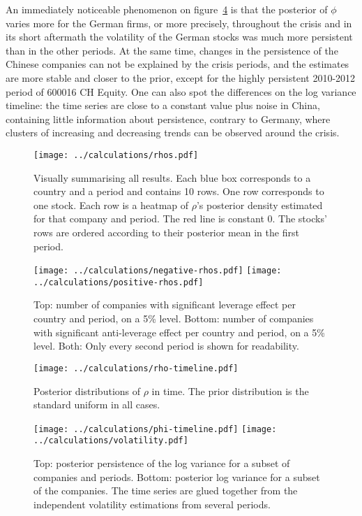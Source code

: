 An immediately noticeable phenomenon on figure~\ref{fig:persistence} is that the posterior of $\phi$ varies more for the German firms, or more precisely, throughout the crisis and in its short aftermath the volatility of the German stocks was much more persistent than in the other periods.
At the same time, changes in the persistence of the Chinese companies can not be explained by the crisis periods, and the estimates are more stable and closer to the prior, except for the highly persistent 2010-2012 period of 600016 CH Equity.
One can also spot the differences on the log variance timeline: the time series are close to a constant value plus noise in China, containing little information about persistence, contrary to Germany, where clusters of increasing and decreasing trends can be observed around the crisis.

\begin{figure}[p]
	\vspace*{-3.2cm}
	\centering
	\texttt{[image: ../calculations/rhos.pdf]}
	\caption[Visually summarising all results]{Visually summarising all results. Each blue box corresponds to a country and a period and contains 10 rows. One row corresponds to one stock. Each row is a heatmap of $\rho$'s posterior density estimated for that company and period. The red line is constant 0. The stocks' rows are ordered according to their posterior mean in the first period.}
	\label{fig:rhos}
\end{figure}


\begin{figure}[p]
	\vspace*{-3.2cm}
	\centering
	\texttt{[image: ../calculations/negative-rhos.pdf]}
	\texttt{[image: ../calculations/positive-rhos.pdf]}
	\caption[Significant leverage effect]{Top: number of companies with significant leverage effect per country and period, on a 5\% level. Bottom: number of companies with significant anti-leverage effect per country and period, on a 5\% level. Both: Only every second period is shown for readability.}
	\label{fig:negative-rhos}
\end{figure}


\begin{figure}[p]
	\vspace*{-3.2cm}
	\centering
	\texttt{[image: ../calculations/rho-timeline.pdf]}
	\caption[Timeline of posterior $\rho$]{Posterior distributions of $\rho$ in time. The prior distribution is the standard uniform in all cases.}
	\label{fig:company-rhos}
\end{figure}


\begin{figure}[p]
	\vspace*{-3.2cm}
	\centering
	\texttt{[image: ../calculations/phi-timeline.pdf]}
	\texttt{[image: ../calculations/volatility.pdf]}
	\caption[Timeline of persistence and volatility]{Top: posterior persistence of the log variance for a subset of companies and periods. Bottom: posterior log variance for a subset of the companies. The time series are glued together from the independent volatility estimations from several periods.}
	\label{fig:persistence}
\end{figure}
